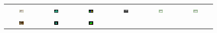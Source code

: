 \documentclass[10pt,journal,cspaper,compsoc]{IEEEtran}
\begin{document}
\begin{figure}[htbp]
\begin{center}
\begin{tabular}{cccccc}
\includegraphics[width=0.15\textwidth]{doe_1.png} &
\includegraphics[width=0.15\textwidth]{doe_2.png} &
\includegraphics[width=0.15\textwidth]{doe_7.png} &
\includegraphics[width=0.15\textwidth]{doe_9.png} &
\includegraphics[width=0.15\textwidth]{doe_11.png} &
\includegraphics[width=0.15\textwidth]{doe_3.png} \\
\includegraphics[width=0.15\textwidth]{GCT_1.jpg} &
\includegraphics[width=0.15\textwidth]{GCT_2.png} &
\includegraphics[width=0.15\textwidth]{GCT_7.png} &

\end{tabular}
\end{center}
\end{figure}
\end{document}
